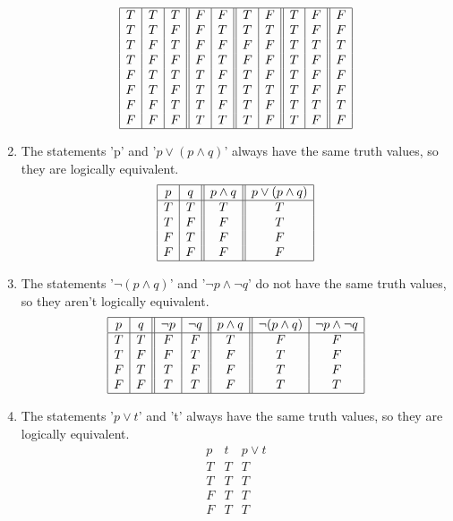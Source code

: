 \documentclass{article}
\begin{document}
\begin{enumerate}[label=\textbf{\arabic*.}]
\[\begin{array}{|c|c|c||c|c||c|c||c|c||c|}
\hline
T & T & T & F & F & T & F & T & F & F \\
T & T & F & F & T & T & T & T & F & F \\
T & F & T & F & F & F & F & T & T & T \\
T & F & F & F & T & F & F & T & F & F \\
F & T & T & T & F & T & F & T & F & F \\
F & T & F & T & T & T & T & T & F & F \\
F & F & T & T & F & T & F & T & T & T \\
F & F & F & T & T & T & F & T & F & F \\
\hline
\end{array}
\]
\item %
The statements 'p' and '$p \lor (p \land q)$' always have the same truth values, so they are logically equivalent.
\[
\begin{array}{|c|c||c||c|}
\hline
p & q & p \land q & p \lor (p \land q)\\
\hline
T & T & T & T \\
T & F & F & T \\
F & T & F & F \\
F & F & F & F \\
\hline
\end{array}
\]
\item %
The statements '$\neg (p \land q)$' and '$\neg p \land \neg q$' do not have the same truth values, so they aren't logically equivalent.
\[
\begin{array}{|c|c||c|c||c||c|c|}
\hline
p & q & \neg p & \neg q & p \land q & \neg (p \land q) & \neg p \land \neg q\\
\hline
T & T & F & F & T & F & F \\
T & F & F & T & F & T & F \\
F & T & T & F & F & T & F \\
F & F & T & T & F & T & T \\
\hline 
\end{array}
\]
\item %
The statements '$p \lor t$' and 't' always have the same truth values, so they are logically equivalent.
\[
\begin{array}{|c|c||c|}
\hline
p & t & p \lor t\\
\hline
T & T & T \\
T & T & T \\
F & T & T \\
F & T & T \\

\end{array}\]
\end{enumerate}
\end{document}
